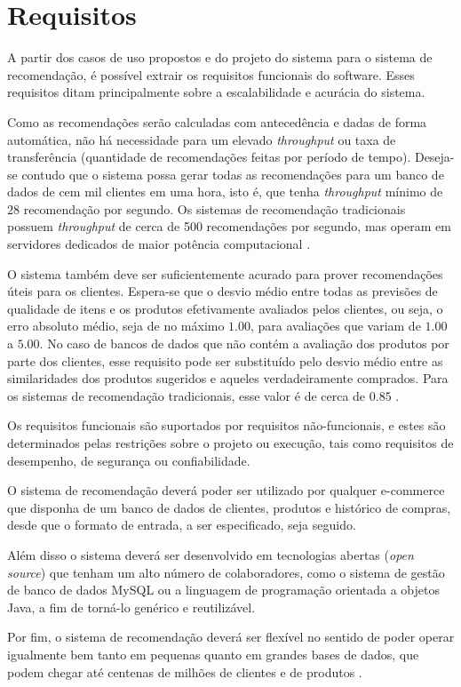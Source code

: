 \chapter[Requisitos]{Requisitos}
\label{chap:requisitos}

A partir dos casos de uso propostos e do projeto do sistema para o sistema de recomendação, é possível extrair os requisitos funcionais do software. Esses requisitos ditam principalmente sobre a escalabilidade e acurácia do sistema.

Como as recomendações serão calculadas com antecedência e dadas de forma automática, não há necessidade para um elevado \textit{throughput} ou taxa de transferência (quantidade de recomendações feitas por período de tempo). Deseja-se contudo que o sistema possa gerar todas as recomendações para um banco de dados de cem mil clientes em uma hora, isto é, que tenha \textit{throughput} mínimo de $28$ recomendação por segundo. Os sistemas de recomendação tradicionais possuem \textit{throughput} de cerca de 500 recomendações por segundo, mas operam em servidores dedicados de maior potência computacional \cite{sarwar2001item}.  

O sistema também deve ser suficientemente acurado para prover recomendações úteis para os clientes. Espera-se que o desvio médio entre todas as previsões de qualidade de itens e os produtos efetivamente avaliados pelos clientes, ou seja, o erro absoluto médio, seja de no máximo $1.00$, para avaliações que variam de $1.00$ a $5.00$. No caso de bancos de dados que não contém a avaliação dos produtos por parte dos clientes, esse requisito pode ser substituído pelo desvio médio entre as similaridades dos produtos sugeridos e aqueles verdadeiramente comprados. Para os sistemas de recomendação tradicionais, esse valor é de cerca de $0.85$ \cite{sarwar2002recommender}.

Os requisitos funcionais são suportados por requisitos não-funcionais, e estes são determinados pelas restrições sobre o projeto ou execução, tais como requisitos de desempenho, de segurança ou confiabilidade. 

O sistema de recomendação deverá poder ser utilizado por qualquer e-commerce que disponha de um banco de dados de clientes, produtos e histórico de compras, desde que o formato de entrada, a ser especificado, seja seguido.

Além disso o sistema deverá ser desenvolvido em tecnologias abertas (\textit{open source}) que tenham um alto número de colaboradores, como o sistema de gestão de banco de dados MySQL ou a linguagem de programação orientada a objetos Java, a fim de torná-lo genérico e reutilizável.

Por fim, o sistema de recomendação deverá ser flexível no sentido de poder operar igualmente bem tanto em pequenas quanto em grandes bases de dados, que podem chegar até centenas de milhões de clientes \cite{amazoncustomers} e de produtos \cite{amazonproducts}.
